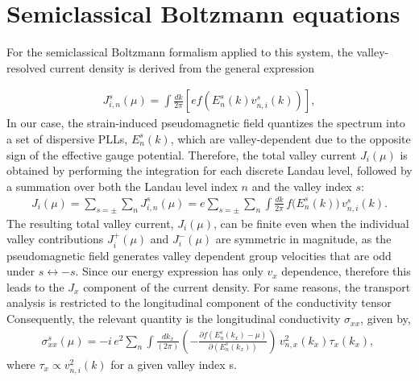 \documentclass[aps,prb, onecolumn,nofootinbib,citeautoscript,10pt]{revtex4-2}
\begin{document}
\section{Semiclassical Boltzmann equations}

For the semiclassical Boltzmann formalism applied to this system, the valley-resolved current density is derived from the general expression

\begin{align}
J_{i,n}^s(\mu)= \int \frac{dk}{2 \pi}[e f(E_n^s(k)v_{n,i}^s(k))],
\end{align}
 In our case, the strain-induced pseudomagnetic field quantizes the spectrum into a set of dispersive PLLs, $E_{n}^{s}(k)$, which are valley-dependent due to the opposite sign of the effective gauge potential. Therefore, the total valley current $J_{i}(\mu)$ is obtained by performing the integration for each discrete Landau level, followed by a summation over both the Landau level index $n$ and the valley index $s$:
\begin{align}
\label{eq:J_total}
J_{i}(\mu) = \sum_{s=\pm} \sum_{n} J_{i,n}^{s}(\mu) = e \sum_{s=\pm} \sum_{n} \int \frac{dk}{2\pi} \, f\big(E_{n}^{s}(k)\big) \, v_{n,i}^{s}(k).
\end{align}
The resulting total valley current, $J_{i}(\mu)$, can be finite even when the individual valley contributions $J_{i}^{+}(\mu)$ and $J_{i}^{-}(\mu)$ are symmetric in magnitude, as the pseudomagnetic field generates valley dependent group velocities that are odd under $s \leftrightarrow -s$. Since our energy expression has only $v_x$ dependence, therefore this leads to the $J_x$ component of the current density. For same reasons, the transport analysis is restricted to the longitudinal component of the conductivity tensor Consequently, the relevant quantity is the longitudinal conductivity $\sigma_{xx}$, given by,
\begin{align}
\sigma_{xx}^s(\mu)
=  -i\, e^2 \sum_{n} \int \frac{d k_x}{(2\pi)}
(-\frac{\partial f (E_n^s(k_x)-\mu)}{\partial(E_n^s(k_x))})\,
v_{n,x}^2(k_x) \tau_x(k_x),
\
\end{align}
where $\tau_x \propto v_{n,i}^2(k) $ for a given valley index s.
\label{secb}

\label{secsum}




 
\end{document}
